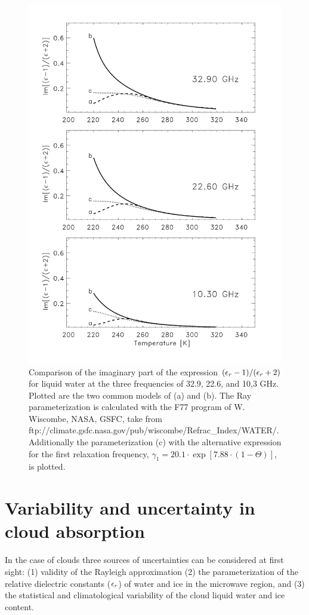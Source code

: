 \begin{figure}
  \begin{center}
   \includegraphics*[width=0.75\hsize, angle=0]{refractive_water_comp_T}
  \end{center}
  \caption[Refractive index comparison.]{Comparison of the imaginary part of the expression 
    \mbox{$(\epsilon_r-1)/(\epsilon_r+2)$} for liquid water at the three 
    frequencies of 32.9, 22.6, and 10,3 GHz. Plotted are the two common
    models of \citet{liebeetal:91} (a) and \citet{ray:72} (b). 
    The Ray parameterization is calculated with the F77 program 
    of W. Wiscombe, NASA, GSFC, take from 
    ftp://climate.gsfc.nasa.gov/pub/wiscombe/Refrac\_Index/WATER/.
    Additionally the \citet{liebeetal:91} parameterization (c) with the 
    alternative expression for the first relaxation frequency, 
    $\gamma_1 = 20.1\cdot\exp{[7.88\cdot(1-\Theta)]}$, is plotted.}
 \label{fig:refrac_water_comp}
\end{figure}


\section{Variability and uncertainty in cloud absorption}
\label{sec:abs_theory:ref_uncert_clouds}
In the case of clouds three sources of uncertainties can be considered
at first sight: (1) validity of the Rayleigh approximation (2) the 
parameterization of the relative dielectric constants ($\epsilon_r$) of water 
and ice in the microwave region, and (3) the statistical and
climatological variability of the cloud liquid water and ice content.

